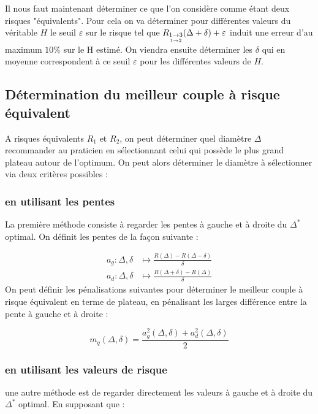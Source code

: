 Il nous faut maintenant déterminer ce que l'on considère comme étant deux risques "équivalents". Pour cela on va déterminer pour différentes valeurs du véritable $H$ le seuil $\varepsilon$ sur le risque tel que $R_{\underset{1 \rightarrow 2}{1 \rightarrow 3}}(\Delta + \delta) + \varepsilon$ induit une erreur d'au maximum $10$\% sur le H estimé. On viendra ensuite déterminer les $\delta$ qui en moyenne correspondent à ce seuil $\varepsilon$ pour les différentes valeurs de $H$.

\subsection{Détermination du meilleur couple à risque \og équivalent \fg}

A risques équivalents $R_1$ et $R_2$, on peut déterminer quel diamètre $\Delta$ recommander au praticien en sélectionnant celui qui possède le plus grand \og plateau \fg autour de l'optimum. On peut alors déterminer le diamètre à sélectionner via deux critères possibles :

\subsubsection{en utilisant les pentes}


La première méthode consiste à regarder les pentes à gauche et à droite du $\Delta^*$ optimal. On définit les pentes de la façon suivante :

\begin{align*}
	a_g : \Delta, \delta & \mapsto \frac{R(\Delta) - R(\Delta - \delta)}{\delta} \\
	a_d : \Delta, \delta & \mapsto \frac{R(\Delta + \delta) - R(\Delta)}{\delta}
\end{align*}
On peut définir les pénalisations suivantes pour déterminer le meilleur couple à risque équivalent en terme de plateau, en pénalisant les larges différence entre la pente à gauche et à droite :

\begin{equation*}
	m_q(\Delta, \delta) = \frac{a_g^2(\Delta, \delta) + a_d^2(\Delta, \delta)}{2}
\end{equation*}

\subsubsection{en utilisant les valeurs de risque}
une autre méthode est de regarder directement les valeurs à gauche et à droite du $\Delta^*$ optimal. En supposant que :

